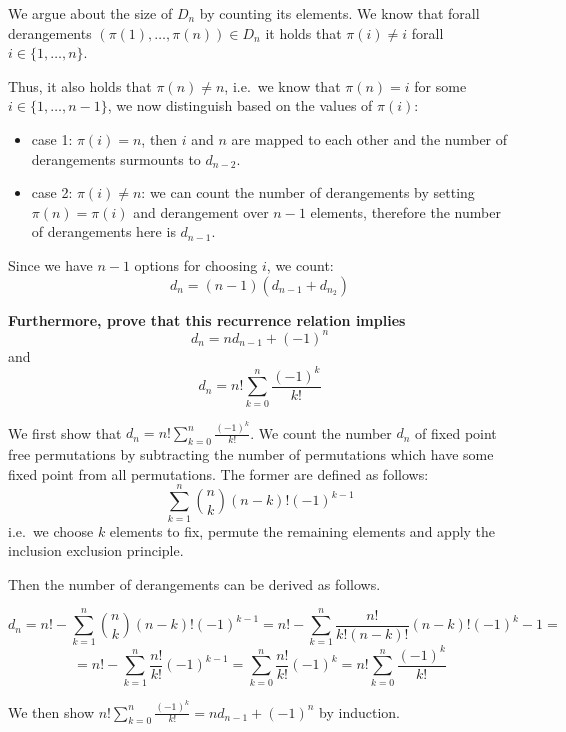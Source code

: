 \documentclass[
]{article}
\providecommand{\tightlist}{%
  \setlength{\itemsep}{0pt}\setlength{\parskip}{0pt}}
\begin{document}
We argue about the size of \(D_n\) by counting its elements. We know
that forall derangements \((\pi(1), \dots, \pi(n)) \in D_n\) it holds
that \(\pi(i) \neq i\) forall \(i \in \{1, \dots, n\}\).

Thus, it also holds that \(\pi(n) \neq n\), i.e.~we know that
\(\pi(n) = i\) for some \(i \in \{1, \dots, n-1\}\), we now distinguish
based on the values of \(\pi(i)\):

\begin{itemize}
\tightlist
\item
  case 1: \(\pi(i) = n\), then \(i\) and \(n\) are mapped to each other
  and the number of derangements surmounts to \(d_{n-2}\).
\item
  case 2: \(\pi(i) \neq n\): we can count the number of derangements by
  setting \(\pi(n) = \pi(i)\) and derangement over \(n-1\) elements,
  therefore the number of derangements here is \(d_{n-1}\).
\end{itemize}

Since we have \(n-1\) options for choosing \(i\), we count: \[
d_n = (n-1) (d_{n-1} + d_{n_2})
\]

\textbf{Furthermore, prove that this recurrence relation implies} \[
d_n = n d_{n-1} + (-1)^n
\] and \[
d_n = n! \sum_{k=0}^n \frac{(-1)^k}{k!}
\]

We first show that \(d_n = n! \sum_{k=0}^n \frac{(-1)^k}{k!}\). We count
the number \(d_n\) of fixed point free permutations by subtracting the
number of permutations which have some fixed point from all
permutations. The former are defined as follows: \[
\sum_{k=1}^n \binom{n}{k} (n-k)! (-1)^{k-1}
\] i.e.~we choose \(k\) elements to fix, permute the remaining elements
and apply the inclusion exclusion principle.

Then the number of derangements can be derived as follows.

\[
d_n = n! - \sum_{k=1}^n \binom{n}{k} (n-k)! (-1)^{k-1} = n!- \sum_{k=1}^n \frac{n!}{k!(n-k)!} (n-k)! (-1)^k-1 =
\] \[
=n! - \sum_{k=1}^n \frac{n!}{k!} (-1)^{k-1} = \sum_{k=0}^n \frac{n!}{k!} (-1)^k = n! \sum_{k=0}^n \frac{(-1)^k}{k!}
\]

We then show \(n! \sum_{k=0}^n \frac{(-1)^k}{k!} = n d_{n-1} + (-1)^n\)
by induction.
\end{document}
